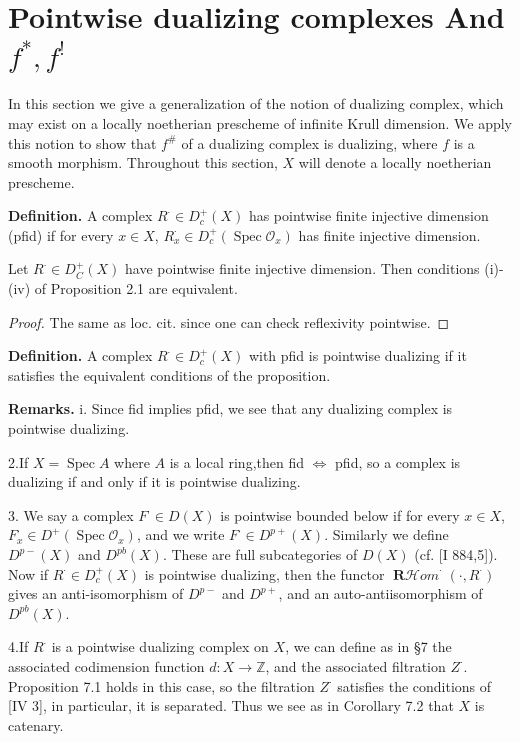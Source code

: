 \documentclass[12pt]{book}
\newcommand{\sheaf}[1]{\mathcal{#1}}
\DeclareMathOperator{\RHom}{\mathbf{R}\mathcal{H}\textit{om}}
\DeclareMathOperator{\Spec}{Spec}
\begin{document}
\setcounter{page}{286}
\section{Pointwise dualizing complexes And \(f^*,f^!\)}

In this section we give a generalization of the notion of dualizing complex, which may exist on a locally noetherian prescheme of infinite Krull dimension. We apply this notion to show that \(f^{\#}\) of a dualizing complex is dualizing, where \(f\) is a smooth morphism. Throughout this section, \(X\) will denote a locally noetherian prescheme.

\textbf{Definition.}
A complex \(R^{\cdot} \in D_{c}^{+}(X)\) has pointwise finite injective dimension (pfid) if for every \(x \in X\),
\(R_{x}^{\cdot} \in D_{c}^{+}(\Spec \sheaf{O}_{x})\)
has finite injective dimension.

\begin{proposition}
Let \(R^{\cdot} \in D_{C}^{+}(X)\) have pointwise finite injective dimension. Then conditions (i)-(iv) of Proposition 2.1
are equivalent.
\end{proposition}

\begin{proof}
The same as loc. cit. since one can check reflexivity pointwise.
\end{proof}

\textbf{Definition.}
A complex \(R^{\cdot} \in D_{c}^{+}(X)\) with pfid is pointwise dualizing if it satisfies the equivalent conditions of the proposition.

\textbf{Remarks.}
i. Since fid implies pfid, we see that any dualizing complex is pointwise dualizing.

2.If \(X = \Spec A\) where \(A\) is a local ring,then fid \(\iff\) pfid, so a complex is dualizing if and only if it is
pointwise dualizing.

\setcounter{page}{287}
3. We say a complex \(F^{\cdot} \in D(X)\) is pointwise bounded below if for every \(x \in X\),
\(F_{x}^{\cdot} \in D^{+}(\Spec \sheaf{O}_{x})\),
and we write \(F^{\cdot} \in D^{p+}(X)\). Similarly we define \(D^{p-}(X)\) and \(D^{pb}(X)\).
These are full subcategories of \(D(X)\) (cf. [I 884,5]).
Now if \(R^{\cdot} \in D_{c}^{+}(X)\) is pointwise dualizing, then the functor \(\RHom^{\cdot}(\cdot, R^{\cdot})\) gives an anti-isomorphism of \(D^{p-}\) and \(D^{p+}\), and an auto-antiisomorphism of \(D^{pb}(X)\).

4.If \(R^{\cdot}\) is a pointwise dualizing complex on \(X\), we can define as in \S7 the associated codimension function \(d: X \to \mathbb{Z}\), and the associated filtration \(Z^{\cdot}\).
Proposition 7.1 holds in this case, so the filtration \(Z^{\cdot}\) satisfies the conditions of [IV 3], in particular, it is separated. Thus we see as in Corollary 7.2 that \(X\) is catenary.
\end{document}
